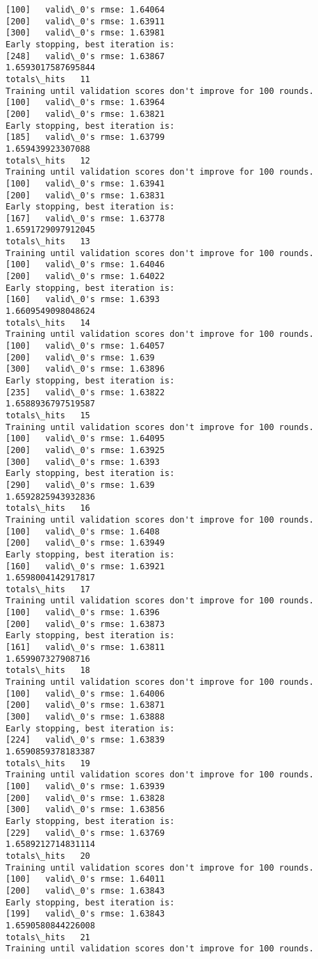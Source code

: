 \documentclass[11pt]{article}
\begin{document}
\begin{Verbatim}[commandchars=\\\{\}]
[100]	valid\_0's rmse: 1.64064
[200]	valid\_0's rmse: 1.63911
[300]	valid\_0's rmse: 1.63981
Early stopping, best iteration is:
[248]	valid\_0's rmse: 1.63867
1.6593017587695844
totals\_hits   11
Training until validation scores don't improve for 100 rounds.
[100]	valid\_0's rmse: 1.63964
[200]	valid\_0's rmse: 1.63821
Early stopping, best iteration is:
[185]	valid\_0's rmse: 1.63799
1.659439923307088
totals\_hits   12
Training until validation scores don't improve for 100 rounds.
[100]	valid\_0's rmse: 1.63941
[200]	valid\_0's rmse: 1.63831
Early stopping, best iteration is:
[167]	valid\_0's rmse: 1.63778
1.6591729097912045
totals\_hits   13
Training until validation scores don't improve for 100 rounds.
[100]	valid\_0's rmse: 1.64046
[200]	valid\_0's rmse: 1.64022
Early stopping, best iteration is:
[160]	valid\_0's rmse: 1.6393
1.6609549098048624
totals\_hits   14
Training until validation scores don't improve for 100 rounds.
[100]	valid\_0's rmse: 1.64057
[200]	valid\_0's rmse: 1.639
[300]	valid\_0's rmse: 1.63896
Early stopping, best iteration is:
[235]	valid\_0's rmse: 1.63822
1.6588936797519587
totals\_hits   15
Training until validation scores don't improve for 100 rounds.
[100]	valid\_0's rmse: 1.64095
[200]	valid\_0's rmse: 1.63925
[300]	valid\_0's rmse: 1.6393
Early stopping, best iteration is:
[290]	valid\_0's rmse: 1.639
1.6592825943932836
totals\_hits   16
Training until validation scores don't improve for 100 rounds.
[100]	valid\_0's rmse: 1.6408
[200]	valid\_0's rmse: 1.63949
Early stopping, best iteration is:
[160]	valid\_0's rmse: 1.63921
1.6598004142917817
totals\_hits   17
Training until validation scores don't improve for 100 rounds.
[100]	valid\_0's rmse: 1.6396
[200]	valid\_0's rmse: 1.63873
Early stopping, best iteration is:
[161]	valid\_0's rmse: 1.63811
1.659907327908716
totals\_hits   18
Training until validation scores don't improve for 100 rounds.
[100]	valid\_0's rmse: 1.64006
[200]	valid\_0's rmse: 1.63871
[300]	valid\_0's rmse: 1.63888
Early stopping, best iteration is:
[224]	valid\_0's rmse: 1.63839
1.6590859378183387
totals\_hits   19
Training until validation scores don't improve for 100 rounds.
[100]	valid\_0's rmse: 1.63939
[200]	valid\_0's rmse: 1.63828
[300]	valid\_0's rmse: 1.63856
Early stopping, best iteration is:
[229]	valid\_0's rmse: 1.63769
1.6589212714831114
totals\_hits   20
Training until validation scores don't improve for 100 rounds.
[100]	valid\_0's rmse: 1.64011
[200]	valid\_0's rmse: 1.63843
Early stopping, best iteration is:
[199]	valid\_0's rmse: 1.63843
1.6590580844226008
totals\_hits   21
Training until validation scores don't improve for 100 rounds.

\end{Verbatim}
\end{document}

